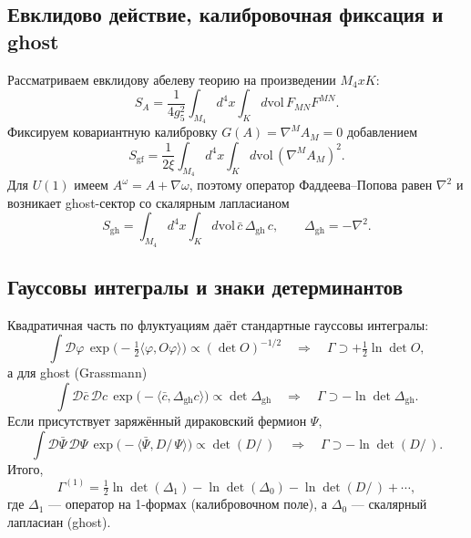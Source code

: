 \documentclass[12pt]{article}
\def\times{x}%
\begin{document}
\subsection{Евклидово действие, калибровочная фиксация и ghost}
Рассматриваем евклидову абелеву теорию на произведении $M_4\times K$:
\begin{equation}
  S_A=\frac{1}{4g_5^2}\int_{M_4} d^4x\int_K d\mathrm{vol}\, F_{MN}F^{MN}.
\end{equation}
Фиксируем ковариантную калибровку $G(A)=\nabla^M A_M=0$ добавлением
\begin{equation}
  S_{\mathrm{gf}}=\frac{1}{2\xi}\int_{M_4} d^4x\int_K d\mathrm{vol}\,(\nabla^M A_M)^2.
\end{equation}
Для $U(1)$ имеем $A^\omega=A+\nabla\omega$, поэтому оператор Фаддеева--Попова равен $\nabla^2$ и возникает ghost-сектор со скалярным лапласианом
\begin{equation}
  S_{\mathrm{gh}}=\int_{M_4} d^4x\int_K d\mathrm{vol}\,\bar c\,\Delta_{\mathrm{gh}}\,c,
  \qquad \Delta_{\mathrm{gh}}=-\nabla^2.
\end{equation}

\subsection{Гауссовы интегралы и знаки детерминантов}
Квадратичная часть по флуктуациям даёт стандартные гауссовы интегралы:
\begin{equation}
  \int\mathcal{D}\varphi\,\exp\bigl(-\tfrac12\langle\varphi,O\varphi\rangle\bigr)\propto (\det O)^{-1/2}
  \quad\Rightarrow\quad
  \Gamma\supset +\tfrac12\ln\det O,
\end{equation}
а для ghost (Grassmann)
\begin{equation}
  \int\mathcal{D}\bar c\,\mathcal{D}c\,\exp\bigl(-\langle\bar c,\Delta_{\mathrm{gh}}c\rangle\bigr)\propto \det\Delta_{\mathrm{gh}}
  \quad\Rightarrow\quad
  \Gamma\supset -\ln\det\Delta_{\mathrm{gh}}.
\end{equation}
Если присутствует заряжённый дираковский фермион $\Psi$,
\begin{equation}
  \int\mathcal{D}\bar\Psi\,\mathcal{D}\Psi\,\exp\bigl(-\langle\bar\Psi,D\!\!\!/\,\Psi\rangle\bigr)\propto \det(D\!\!\!/\,)
  \quad\Rightarrow\quad
  \Gamma\supset -\ln\det(D\!\!\!/\,).
\end{equation}
Итого,
\begin{equation}
  \Gamma^{(1)}=\tfrac12\ln\det(\Delta_1)-\ln\det(\Delta_0)-\ln\det(D\!\!\!/\,)+\cdots,
\end{equation}
где $\Delta_1$ --- оператор на 1-формах (калибровочном поле), а $\Delta_0$ --- скалярный лапласиан (ghost).
\end{document}
